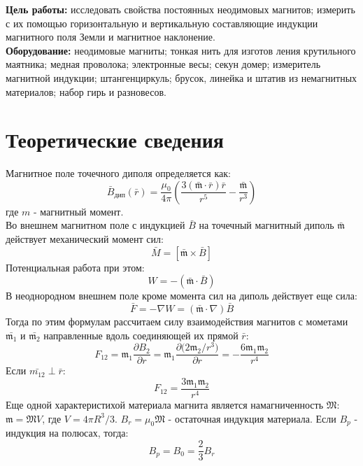 \textbf{Цель работы:} исследовать свойства постоянных неодимовых магнитов;
измерить с их помощью горизонтальную и вертикальную составляющие
индукции магнитного поля Земли и магнитное наклонение.\\\indent
\textbf{Оборудование:} неодимовые магниты; тонкая нить для изготов­
ления крутильного маятника; медная проволока; электронные весы; секун­
домер; измеритель магнитной индукции; штангенциркуль; брусок, линейка
и штатив из немагнитных материалов; набор гирь и разновесов.
\section*{Теоретические сведения}
Магнитное поле точечного диполя определяется как:
\begin{equation}
    \bar{B}_{\text{дип}}(\bar{r}) = \frac{\mu_0}{4\pi}\left (\frac{3(\bar{\mathfrak{m}}\cdot \bar{r})\bar{r}}{r^5} - \frac{\bar{\mathfrak{m}}}{r^3}\right )
\end{equation}
где $m$ - магнитный момент.\\ 
\indent Во внешнем магнитном поле с индукцией $\bar{B}$ на точечный магнитный
диполь $\bar{\mathfrak{m}}$ действует механический момент сил:
\begin{equation}
    \bar{M} = [\bar{\mathfrak{m}} \times \bar{B}]
\end{equation}
Потенциальная работа при этом:
\begin{equation}
    W = - (\bar{\mathfrak{m}} \cdot \bar{B})
\end{equation}
В неоднородном внешнем поле кроме момента сил на диполь действует еще сила:
\begin{equation}
    \bar{F} = -\nabla W = (\bar{\mathfrak{m}}\cdot \nabla)\bar{B}
\end{equation}
Тогда по этим формулам рассчитаем силу взаимодействия магнитов с мометами $\bar{\mathfrak{m_1}}$ и $\bar{\mathfrak{m_2}}$ направленные вдоль соединяющей их прямой $\bar{r}$:
\begin{equation}
    F_{12} = \mathfrak{m_1}\frac{\partial B_2}{\partial r} = \mathfrak{m_1} \frac{\partial{(2 \mathfrak{m_2}/r^3})}{\partial r} = -\frac{6\mathfrak{m_1} \mathfrak{m_2}}{r^4}
\end{equation}
Если $\bar{m_{12}} \perp \bar{r}$:
\begin{equation}
    F_{12} = \frac{3\mathfrak{m_1 m_2}}{r^4}
\end{equation}
Еще одной характеристихой материала магнита является намагниченность $\mathfrak{M}$:
$\mathfrak{m} = \mathfrak{M}V$, где $V = 4\pi R^3/3$. $B_r = \mu_0 \mathfrak{M}$ - остаточная индукция материала. Если $B_p$ - индукция на полюсах, тогда:
\begin{equation}
    B_p = B_0 = \frac{2}{3}B_r
\end{equation}
    
